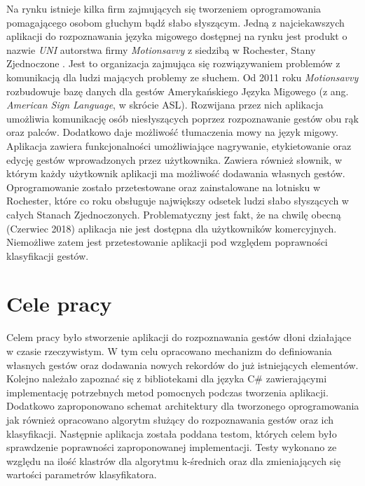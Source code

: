 Na rynku istnieje kilka firm zajmujących się tworzeniem oprogramowania pomagającego osobom głuchym bądź słabo słyszącym. Jedną z najciekawszych aplikacji do rozpoznawania języka migowego dostępnej na rynku jest produkt o nazwie \textit{UNI} autorstwa firmy \textit{Motionsavvy} z siedzibą w Rochester, Stany Zjednoczone \cite{Uni}. Jest to organizacja zajmująca się rozwiązywaniem problemów z komunikacją dla ludzi mających problemy ze słuchem. Od 2011 roku \textit{Motionsavvy} rozbudowuje bazę danych dla gestów Amerykańskiego Języka Migowego (z ang. \textit{American Sign Language}, w skrócie ASL). Rozwijana przez nich aplikacja umożliwia komunikację osób niesłyszących poprzez rozpoznawanie gestów obu rąk oraz palców. Dodatkowo daje możliwość tłumaczenia mowy na język migowy. Aplikacja zawiera funkcjonalności umożliwiające nagrywanie, etykietowanie oraz edycję gestów wprowadzonych przez użytkownika. Zawiera również słownik, w którym każdy użytkownik aplikacji ma możliwość dodawania własnych gestów. Oprogramowanie zostało przetestowane oraz zainstalowane na lotnisku w Rochester, które co roku obsługuje największy odsetek ludzi słabo słyszących w całych Stanach Zjednoczonych. Problematyczny jest fakt, że na chwilę obecną (Czerwiec 2018) aplikacja nie jest dostępna dla użytkowników komercyjnych. Niemożliwe zatem jest przetestowanie aplikacji pod względem poprawności klasyfikacji gestów.

\section{Cele pracy}
\label{sec:celePracy}
Celem pracy było stworzenie aplikacji do rozpoznawania gestów dłoni działające w czasie rzeczywistym. W tym celu opracowano mechanizm do definiowania własnych gestów oraz dodawania nowych rekordów do już istniejących elementów. Kolejno należało zapoznać się z bibliotekami dla języka C\# zawierającymi implementację potrzebnych metod pomocnych podczas tworzenia aplikacji. Dodatkowo zaproponowano schemat architektury dla tworzonego oprogramowania jak również opracowano algorytm służący do rozpoznawania gestów oraz ich klasyfikacji. Następnie aplikacja została poddana testom, których celem było sprawdzenie poprawności zaproponowanej implementacji. Testy wykonano ze względu na ilość klastrów dla algorytmu k-średnich oraz dla zmieniających się wartości parametrów klasyfikatora.

